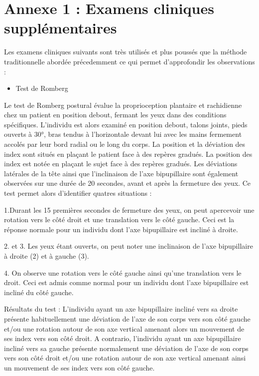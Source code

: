 \section{Annexe 1 : Examens cliniques supplémentaires}

Les examens cliniques suivants sont très utilisés et plus poussés que la méthode traditionnelle abordée précedemment ce
qui permet d'approfondir les observations :

\begin{itemize}
    \item Test de Romberg
\end{itemize}

Le test de Romberg postural évalue la proprioception plantaire et rachidienne chez un patient en position debout, fermant les yeux dans des conditions spécifiques.  L’individu est alors examiné en position debout, talons joints, pieds ouverts à 30°, bras tendus à l'horizontale devant lui avec les mains fermement accolés par leur bord radial ou le long du corps.  La position et la déviation des index sont situés en plaçant le patient face à des repères gradués. La position des index est notée en plaçant le sujet face à des repères gradués. Les déviations latérales de la tête ainsi que l’inclinaison de l’axe bipupillaire sont également observées sur une durée de 20 secondes, avant et après la fermeture des yeux.
Ce test permet alors d’identifier quatres situations : 

1.Durant les 15 premières secondes de fermeture des yeux, on peut apercevoir une rotation vers le côté droit et une translation vers le côté gauche. Ceci est la réponse normale pour un individu dont l’axe bipupillaire est incliné à droite.

2. et 3.  Les yeux étant ouverts, on peut noter une inclinaison de l’axe bipupillaire à droite (2) et à gauche (3).

4. On observe une rotation vers le côté gauche ainsi qu’une translation vers le droit. Ceci est admis comme normal pour un individu dont l’axe bipupillaire est incliné du côté gauche.

Résultats du test : 
L’individu ayant un axe bipupillaire incliné vers sa droite présente habituellement une déviation de l’axe de son corps vers son côté gauche et/ou une rotation autour de son axe vertical amenant alors un mouvement de ses index vers son côté droit.
A contrario, l’individu ayant un axe bipupillaire incliné vers sa gauche présente normalement une déviation de l’axe de son corps vers son côté droit et/ou une rotation autour de son axe vertical amenant ainsi un mouvement de ses index vers son côté gauche.

